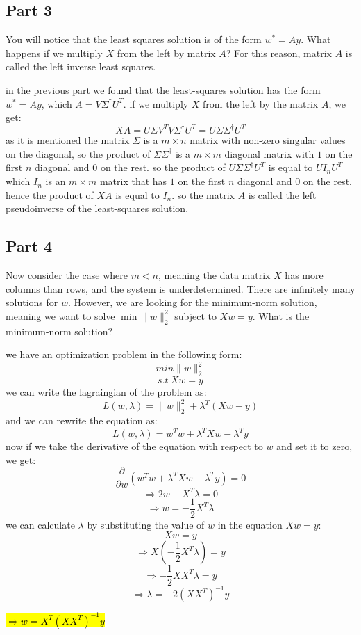 \subsection{Part 3}
You will notice that the least squares solution is of the form \( w^* = A y \). What happens if we multiply \( X \) from the left by matrix \( A \)? For this reason, matrix \( A \) is called the left inverse least squares.
\begin{qsolve}
	\begin{qsolve}[]
		in the previous part we found that the least-squares solution has the form \( w^* = Ay \), which $A = V \Sigma^{\dagger} U^T$. if we multiply \(X\) from the left by the matrix \(A\), we get:
		$$XA = U \Sigma V^T V \Sigma^{\dagger} U^T = U \Sigma \Sigma^{\dagger} U^T$$
		as it is mentioned the matrix $\Sigma$ is a $m \times n $ matrix with non-zero singular values on the diagonal, so the product of $\Sigma \Sigma^{\dagger}$ is a $m \times m$ diagonal matrix with $1$ on the first $n$ diagonal and $0$ on the rest. so the product of $U \Sigma \Sigma^{\dagger} U^T$ is equal to $U I_n U^T$ which $I_n$ is an $m \times m$ matrix that has $1$ on the first $n$ diagonal and $0$ on the rest. hence the product of $XA$ is equal to $I_n$. so the matrix $A$ is called the left pseudoinverse of the least-squares solution.
	\end{qsolve}
\end{qsolve}
\subsection{Part 4}
Now consider the case where \( m < n \), meaning the data matrix \( X \) has more columns than rows, and the system is underdetermined. There are infinitely many solutions for \( w \). However, we are looking for the minimum-norm solution, meaning we want to solve \( \min \|w\|^2_2 \) subject to \( Xw = y \). What is the minimum-norm solution?
\begin{qsolve}
	\begin{qsolve}[]
		we have an optimization problem in the following form:
		$$min \|w\|^2_2$$
		$$s.t \ Xw = y$$
		we can write the lagraingian of the problem as:
		$$L(w, \lambda) = \|w\|^2_2 + \lambda^T (Xw - y)$$
		and we can rewrite the equation as:
		\splitqsolve[\splitqsolve]
		$$L(w, \lambda) = w^T w + \lambda^T Xw - \lambda^T y$$
		now if we take the derivative of the equation with respect to \(w\) and set it to zero, we get:
		$$\frac{\partial}{\partial w} (w^T w + \lambda^T Xw - \lambda^T y) = 0$$
		$$\Rightarrow 2w + X^T \lambda = 0$$
		$$\Rightarrow w = -\frac{1}{2} X^T \lambda$$
		we can calculate $\lambda$ by substituting the value of $w$ in the equation $Xw = y$:
		$$Xw = y$$
		$$\Rightarrow X(-\frac{1}{2} X^T \lambda) = y$$
		$$\Rightarrow -\frac{1}{2} XX^T \lambda = y$$
		$$\Rightarrow \lambda = -2 (XX^T)^{-1} y$$
		\begin{center}
			\hl{$\Rightarrow w = X^T (XX^T)^{-1} y$}
		\end{center}
	\end{qsolve}
\end{qsolve}
